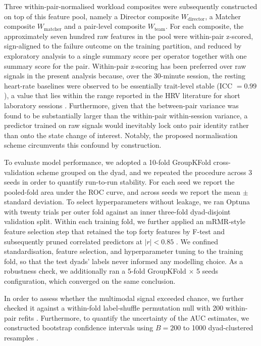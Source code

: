 Three within-pair-normalised workload composites were subsequently constructed on top of this feature pool, namely a Director composite $W_{\text{director}}$, a Matcher composite $W_{\text{matcher}}$ and a pair-level composite $W_{\text{team}}$. For each composite, the approximately seven hundred raw features in the pool were within-pair z-scored, sign-aligned to the failure outcome on the training partition, and reduced by exploratory analysis to a single summary score per operator together with one summary score for the pair. Within-pair z-scoring has been preferred over raw signals in the present analysis because, over the 30-minute session, the resting heart-rate baselines were observed to be essentially trait-level stable (ICC $= 0.99$), a value that lies within the range reported in the HRV literature for short laboratory sessions \cite{shaffer2017hrv,shaffer2014healthy,laborde2017hrv}. Furthermore, given that the between-pair variance was found to be substantially larger than the within-pair within-session variance, a predictor trained on raw signals would inevitably lock onto pair identity rather than onto the state change of interest. Notably, the proposed normalisation scheme circumvents this confound by construction.

To evaluate model performance, we adopted a 10-fold GroupKFold cross-validation scheme grouped on the dyad, and we repeated the procedure across 3 seeds in order to quantify run-to-run stability. For each seed we report the pooled-fold area under the ROC curve, and across seeds we report the mean $\pm$ standard deviation. To select hyperparameters without leakage, we ran Optuna with twenty trials per outer fold against an inner three-fold dyad-disjoint validation split. Within each training fold, we further applied an mRMR-style feature selection step that retained the top forty features by F-test and subsequently pruned correlated predictors at $|r| < 0.85$ \cite{peng2005feature,ding2005minimum}. We confined standardisation, feature selection, and hyperparameter tuning to the training fold, so that the test dyads' labels never informed any modelling choice. As a robustness check, we additionally ran a 5-fold GroupKFold $\times$ 5 seeds configuration, which converged on the same conclusion.

In order to assess whether the multimodal signal exceeded chance, we further checked it against a within-fold label-shuffle permutation null with 200 within-pair refits \cite{maris2007nonparametric,nichols2002nonparametric}. Furthermore, to quantify the uncertainty of the AUC estimates, we constructed bootstrap confidence intervals using $B = 200$ to 1000 dyad-clustered resamples \cite{efron1987better}.

